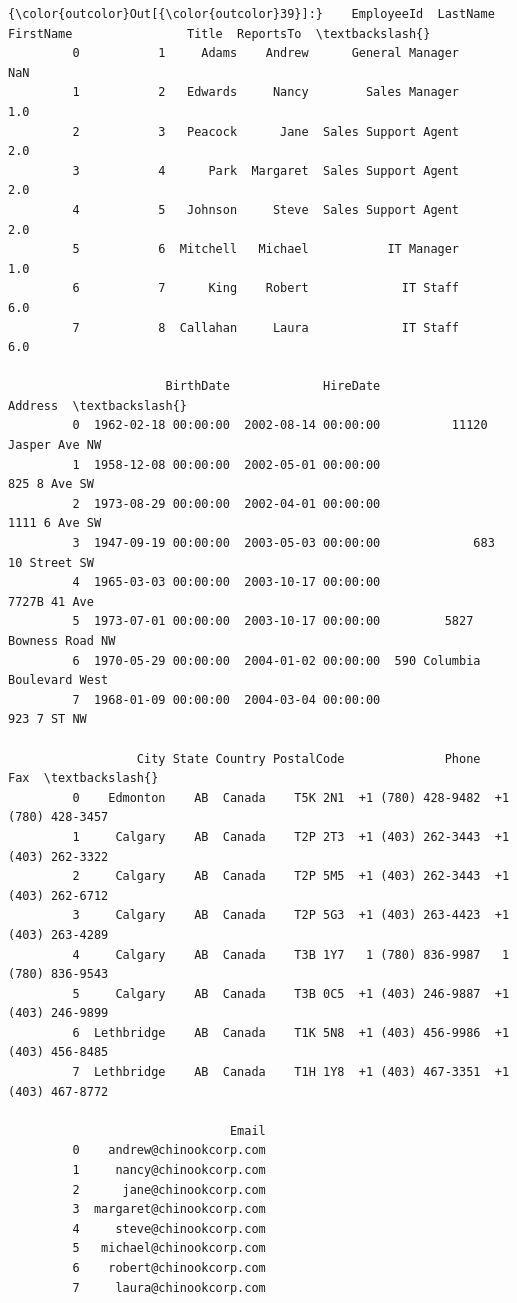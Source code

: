 \documentclass[11pt]{article}
\begin{document}
\begin{Verbatim}[commandchars=\\\{\}]
{\color{outcolor}Out[{\color{outcolor}39}]:}    EmployeeId  LastName FirstName                Title  ReportsTo  \textbackslash{}
         0           1     Adams    Andrew      General Manager        NaN   
         1           2   Edwards     Nancy        Sales Manager        1.0   
         2           3   Peacock      Jane  Sales Support Agent        2.0   
         3           4      Park  Margaret  Sales Support Agent        2.0   
         4           5   Johnson     Steve  Sales Support Agent        2.0   
         5           6  Mitchell   Michael           IT Manager        1.0   
         6           7      King    Robert             IT Staff        6.0   
         7           8  Callahan     Laura             IT Staff        6.0   
         
                      BirthDate             HireDate                      Address  \textbackslash{}
         0  1962-02-18 00:00:00  2002-08-14 00:00:00          11120 Jasper Ave NW   
         1  1958-12-08 00:00:00  2002-05-01 00:00:00                 825 8 Ave SW   
         2  1973-08-29 00:00:00  2002-04-01 00:00:00                1111 6 Ave SW   
         3  1947-09-19 00:00:00  2003-05-03 00:00:00             683 10 Street SW   
         4  1965-03-03 00:00:00  2003-10-17 00:00:00                 7727B 41 Ave   
         5  1973-07-01 00:00:00  2003-10-17 00:00:00         5827 Bowness Road NW   
         6  1970-05-29 00:00:00  2004-01-02 00:00:00  590 Columbia Boulevard West   
         7  1968-01-09 00:00:00  2004-03-04 00:00:00                  923 7 ST NW   
         
                  City State Country PostalCode              Phone                Fax  \textbackslash{}
         0    Edmonton    AB  Canada    T5K 2N1  +1 (780) 428-9482  +1 (780) 428-3457   
         1     Calgary    AB  Canada    T2P 2T3  +1 (403) 262-3443  +1 (403) 262-3322   
         2     Calgary    AB  Canada    T2P 5M5  +1 (403) 262-3443  +1 (403) 262-6712   
         3     Calgary    AB  Canada    T2P 5G3  +1 (403) 263-4423  +1 (403) 263-4289   
         4     Calgary    AB  Canada    T3B 1Y7   1 (780) 836-9987   1 (780) 836-9543   
         5     Calgary    AB  Canada    T3B 0C5  +1 (403) 246-9887  +1 (403) 246-9899   
         6  Lethbridge    AB  Canada    T1K 5N8  +1 (403) 456-9986  +1 (403) 456-8485   
         7  Lethbridge    AB  Canada    T1H 1Y8  +1 (403) 467-3351  +1 (403) 467-8772   
         
                               Email  
         0    andrew@chinookcorp.com  
         1     nancy@chinookcorp.com  
         2      jane@chinookcorp.com  
         3  margaret@chinookcorp.com  
         4     steve@chinookcorp.com  
         5   michael@chinookcorp.com  
         6    robert@chinookcorp.com  
         7     laura@chinookcorp.com  
\end{Verbatim}
            
\end{document}
